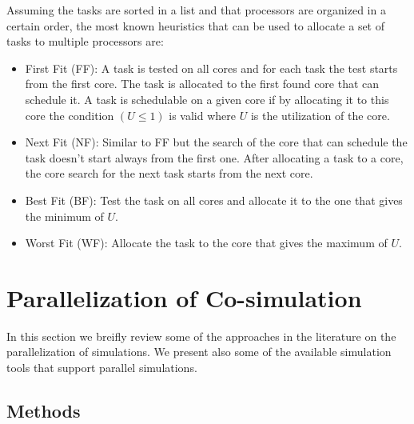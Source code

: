 Assuming the tasks are sorted in a list and that processors are organized in a certain order, the most known heuristics that can be used to allocate a set of tasks to multiple processors are:

\begin{itemize}
\item First Fit (FF): A task is tested on all cores and for each task the test starts from the first core. The task is allocated to the first found core that can schedule it. A task is schedulable on a given core if by allocating it to this core the condition $(U\leq1)$ is valid where $U$ is the utilization of the core.
\item Next Fit (NF): Similar to FF but the search of the core that can schedule the task doesn't start always from the first one. After allocating a task to a core, the core search for the next task starts from the next core.
\item Best Fit (BF): Test the task on all cores and allocate it to the one that gives the minimum of $U$.
\item Worst Fit (WF): Allocate the task to the core that gives the maximum of $U$.
\end{itemize}
  
\section{Parallelization of Co-simulation}

In this section we breifly review some of the approaches in the literature on the parallelization of simulations. We present also some of the available simulation tools that support parallel simulations.

\subsection{Methods}

